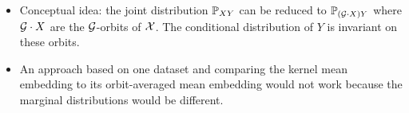 \begin{itemize}
\iffalse
From our paired setup, we have empirical distributions $\widehat{\bbP}_X^{(1)}=\widehat{\bbP}_{g'\cdot X}^{(2)}$. We can approximate the joint distributions by
\begin{align*}
\bbP_{XY}^{(1)} &= \bbP_X^{(1)}\bbP_{Y|X}^{(1)} \approx \widehat{\bbP}_X^{(1)}\bbP_{Y|X}^{(1)}\;, \\
\bbP_{(g'\cdot X)Y}^{(2)} &= \bbP_{g'\cdot X}^{(2)}\bbP_{Y|g'\cdot X}^{(2)} \approx \widehat{\bbP}_{g'\cdot X}^{(2)}\bbP_{Y|g'\cdot X}^{(2)}\;.
\end{align*}

Let $\calO$ be the orbit-averaging operator \parencite{Elesedy:2021}
\[
\calO f(x) = \int_\calG f(g\cdot x)\mathrm{d}\lambda(g)\;.
\]
\parencite{Elesedy:2021,Elesedy:2021:equivariant} show that a function $f$ is $\calG$-invariant if and only if $\calO f=f$. We can likely extend this argument to a function $g(x,y)$ with two inputs where $g$ is $\calG$-invariant in one input, i.e., rewriting $g(x,y)=g_y(x)$ and $g_y(x)$ being $\calG$-invariant if and only if $\calO g_y = g_y$. Applying this to distributions, we should have $\bbP_{Y|X}$ is invariant if and only if for all $y\in\calY$,
\[
\bbP_{Y|X}(y|x)=\int_\calG\bbP_{Y|X}(y|g\cdot x)\mathrm{d}\lambda(g)
\]
and so
\[
\bbP_{Y|X}(y|x)\bbP_X(x)=\int_\calG\mathbb{P}_{Y|X}(y|g\cdot x)\bbP_X(x)\mathrm{d}\lambda(g) \;.
\]
\fi

\item
Conceptual idea: the joint distribution $\mathbb{P}_{XY}$ can be reduced to $\mathbb{P}_{(\mathcal{G}\cdot X)Y}$ where $\mathcal{G}\cdot X$ are the $\calG$-orbits of $\mathcal{X}$. The conditional distribution of $Y$ is invariant on these orbits.

\item
An approach based on one dataset and comparing the kernel mean embedding to its orbit-averaged mean embedding would not work because the marginal distributions would be different.

\end{itemize}

\iffalse
\todo

